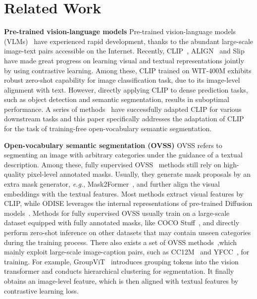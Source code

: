 \section{Related Work}
\label{sec:related_work}

\noindent \textbf{Pre-trained vision-language models}
Pre-trained vision-language models (VLMs)~\cite{Uniter, Virtex, Unicoder-vl, AlignBeforeUse, Hero} have experienced rapid development, thanks to the abundant large-scale image-text pairs accessible on the Internet.
Recently, CLIP~\cite{CLIP}, ALIGN~\cite{ALIGN} and Slip~\cite{Slip} have made great progress on learning visual and textual representations jointly by using contrastive learning. 
Among these, CLIP trained on WIT-400M exhibits robust zero-shot capability for image classification task, due to its image-level alignment with text.
However, directly applying CLIP to dense prediction tasks, such as object detection and semantic segmentation, results in suboptimal performance.
A series of methods~\cite{DetPro,UniDetector, MaskCLIP,GroupViT,TCL,ReCLIP} have successfully adapted CLIP for various downstream tasks and this paper specifically addresses the adaptation of CLIP for the task of training-free open-vocabulary semantic segmentation.

\noindent \textbf{Open-vocabulary semantic segmentation (OVSS)}
OVSS refers to segmenting an image with arbitrary categories under the guidance of a textual description.
Among these, fully supervised OVSS~\cite{OpenSeg,LSeg,ODISE,OVSeg,CATSeg} methods still rely on high-quality pixel-level annotated masks.
Usually, they generate mask proposals by an extra mask generator, \emph{e.g.}, Mask2Former~\cite{Mask2Former}, and further align the visual embeddings with the textual features.
Most methods extract visual features by CLIP, while ODISE leverages the internal representations of pre-trained Diffusion models~\cite{Diffusion}.
Methods for fully supervised OVSS usually train on a large-scale dataset equipped with fully annotated masks, like COCO Stuff~\cite{cocostuff}, and directly perform zero-shot inference on other datasets that may contain unseen categories during the training process.
There also exists a set of OVSS methods~\cite{CoDe,GroupViT,viewco,CoCu},which mainly exploit large-scale image-caption pairs, such as CC12M~\cite{cc12m} and YFCC~\cite{yfcc}, for training.
For example, GroupViT~\cite{GroupViT} introduces grouping tokens into the vision transformer and conducts hierarchical clustering for segmentation.
It finally obtains an image-level feature, which is then aligned with textual features by contrastive learning loss.

